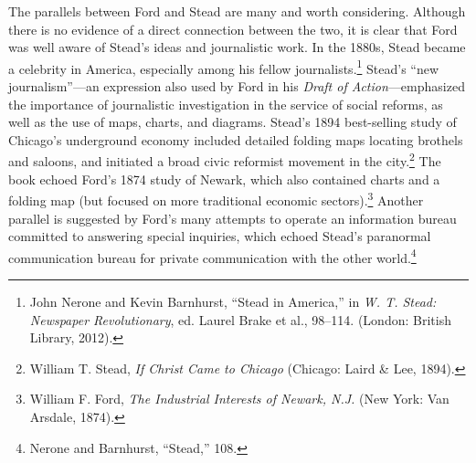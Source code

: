 \documentclass[twoside,symmetric,nobib,justified]{tufte-book}
\begin{document}
The parallels between Ford and Stead are many and worth considering.
Although there is no evidence of a direct connection between the two, it
is clear that Ford was well aware of Stead's ideas and journalistic
work. In the 1880s, Stead became a celebrity in America, especially
among his fellow journalists.\footnote{John Nerone and Kevin Barnhurst,
  ``Stead in America,'' in \emph{W. T. Stead: Newspaper Revolutionary},
  ed. Laurel Brake et al., 98--114. (London: British Library, 2012).}
Stead's ``new journalism''---an expression also used by Ford in his
\emph{Draft of Action}---emphasized the importance of journalistic
investigation in the service of social reforms, as well as the use of
maps, charts, and diagrams. Stead's 1894 best-selling study of Chicago's
underground economy included detailed folding maps locating brothels and
saloons, and initiated a broad civic reformist movement in the
city.\footnote{William T. Stead, \emph{If Christ Came to Chicago}
  (Chicago: Laird \& Lee, 1894).} The book echoed Ford's 1874 study of
Newark, which also contained charts and a folding map (but focused on
more traditional economic sectors).\footnote{William F. Ford, \emph{The
  Industrial Interests of Newark, N.J.} (New York: Van Arsdale, 1874).}
Another parallel is suggested by Ford's many attempts to operate an
information bureau committed to answering special inquiries, which
echoed Stead's paranormal communication bureau for private communication
with the other world.\footnote{Nerone and Barnhurst, ``Stead,'' 108.}
\end{document}
